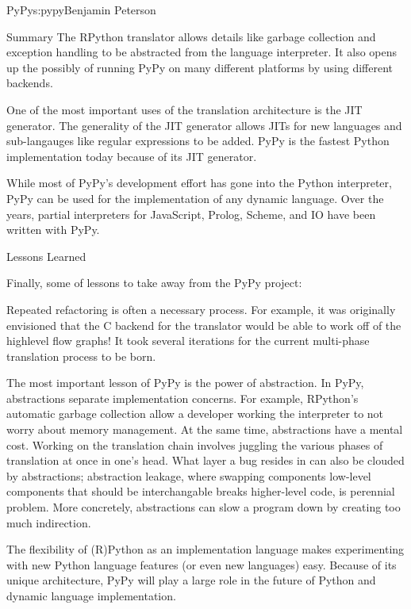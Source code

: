\begin{aosachapter}{PyPy}{s:pypy}{Benjamin Peterson}
\begin{aosasect1}{Summary}
The RPython translator allows details like garbage collection and exception
handling to be abstracted from the language interpreter. It also opens up the
possibly of running PyPy on many different platforms by using different
backends.

One of the most important uses of the translation architecture is the JIT
generator. The generality of the JIT generator allows JITs for new languages and
sub-langauges like regular expressions to be added. PyPy is the fastest Python
implementation today because of its JIT generator.

While most of PyPy's development effort has gone into the Python interpreter,
PyPy can be used for the implementation of any dynamic language. Over the years,
partial interpreters for JavaScript, Prolog, Scheme, and IO have been written
with PyPy.

\end{aosasect1}

\begin{aosasect1}{Lessons Learned}

Finally, some of lessons to take away from the PyPy project:

Repeated refactoring is often a necessary process. For example, it was
originally envisioned that the C backend for the translator would be able to
work off of the highlevel flow graphs! It took several iterations for the
current multi-phase translation process to be born.

The most important lesson of PyPy is the power of abstraction. In PyPy,
abstractions separate implementation concerns. For example, RPython's automatic
garbage collection allow a developer working the interpreter to not worry about
memory management. At the same time, abstractions have a mental cost. Working on
the translation chain involves juggling the various phases of translation at
once in one's head. What layer a bug resides in can also be clouded by
abstractions; abstraction leakage, where swapping components low-level
components that should be interchangable breaks higher-level code, is perennial
problem. More concretely, abstractions can slow a program down by creating too
much indirection.

The flexibility of (R)Python as an implementation language makes experimenting
with new Python language features (or even new languages) easy. Because of its
unique architecture, PyPy will play a large role in the future of Python and
dynamic language implementation.

\end{aosasect1}

\end{aosachapter}
